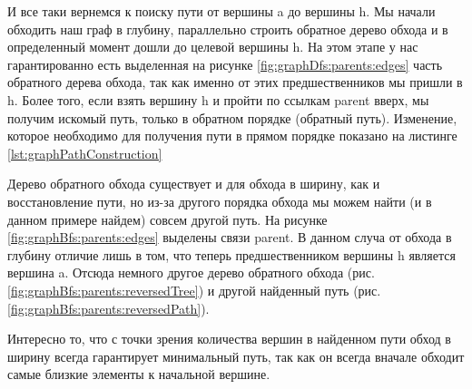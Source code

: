 \documentclass[../../article.tex]{subfiles}
\begin{document}
И все таки вернемся к поиску пути от вершины {\firacodebold a} до вершины {\firacodebold h}. Мы начали обходить наш граф в глубину, параллельно строить обратное дерево обхода и в определенный момент дошли до целевой вершины {\firacodebold h}. На этом этапе у нас гарантированно есть выделенная на рисунке \ref{fig:graphDfs:parents:edges} часть обратного дерева обхода, так как именно от этих предшественников мы пришли в {\firacodebold h}. Более того, если взять вершину {\firacodebold h} и пройти по ссылкам {\firacodebold parent} вверх, мы получим искомый путь, только в обратном порядке (обратный путь). Изменение, которое необходимо для получения пути в прямом порядке показано на листинге \ref{lst:graphPathConstruction}

Дерево обратного обхода существует и для обхода в ширину, как и восстановление пути, но из-за другого порядка обхода мы можем найти (и в данном примере найдем) совсем другой путь. На рисунке \ref{fig:graphBfs:parents:edges} выделены связи {\firacodebold parent}. В данном случа от обхода в глубину отличие лишь в том, что теперь предшественником вершины {\firacodebold h} является вершина {\firacodebold a}. Отсюда немного другое дерево обратного обхода (рис. \ref{fig:graphBfs:parents:reversedTree}) и другой найденный путь (рис. \ref{fig:graphBfs:parents:reversedPath}).

Интересно то, что с точки зрения количества вершин в найденном пути обход в ширину всегда гарантирует минимальный путь, так как он всегда вначале обходит самые близкие элементы к начальной вершине.
\end{document}
